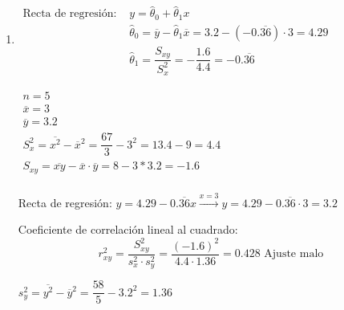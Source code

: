 \begin{enumerate}[label=\color{red}\arabic*),leftmargin=*]
	$h_{\mathrm{top}}=\mu_Y+\dfrac{\cov(X,Y)}{\sigma_X^2}(x-\mu_X)=2+\dfrac{-1}{2}(x-1)=-\dfrac{x}{2}+\dfrac{5}{2}\longrightarrow h_{\mathrm{opt}}(1.5)=2-\dfrac{1}{2}\cdot\dfrac{1}{2}=\bboxed{\dfrac{7}{4}}$
	
	\item {}
	
	$\begin{aligned}
		\text{Recta de regresión: } & y=\hat{\theta}_0+\hat{\theta}_1x\\
		&\hat{\theta}_0=\overline{y}-\hat{\theta}_1\overline{x}=3.2-(-0.\overline{36})\cdot3=4.29\\
		&\hat{\theta}_1=\dfrac{S_{xy}}{S_x^2}=-\dfrac{1.6}{4.4}=-0.\overline{36}
	\end{aligned}$
	
	$\begin{array}{l}
		n=5\\
		\overline{x}=3\\
		\overline{y}=3.2\\
		S_x^2=\overline{x^2}-\overline{x}^2=\dfrac{67}{3}-3^2=13.4-9=4.4\\
		S_{xy}=\overline{xy}-\overline{x}\cdot\overline{y}=8-3*3.2=-1.6\\
	\end{array}$
	
	Recta de regresión: $y=4.29-0.\overline{36}x\xrightarrow{x=3}y=4.29-0.\overline{36}\cdot3=3.2$
	
	Coeficiente de correlación lineal al cuadrado: \[ r_{xy}^2=\dfrac{S_{xy}^2}{s_x^2\cdot s_y^2}=\dfrac{(-1.6)^2}{4.4\cdot1.36}=0.428\text{ Ajuste malo} \]
	
	$s_y^2=\overline{y^2}-\overline{y}^2=\dfrac{58}{5}-3.2^2=1.36$
\end{enumerate}